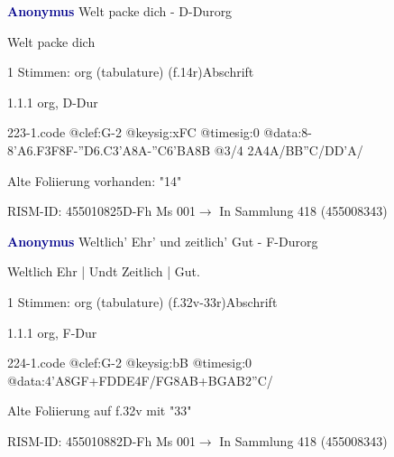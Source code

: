 \documentclass[twocolumn, 12pt]{book}
\begin{document}
\par \vspace{16pt} \textcolor{darkblue}{\textbf{Anonymus  }}\hfillplus{\textbf{[223]}}\newline Welt packe dich - D-Dur\newline org
\par \begin{itshape}[f.14r, at left:] Welt packe dich\end{itshape} 
\par \textcolor{darkblue}{}  1 Stimmen: org (tabulature)  (f.14r)\newline Abschrift
\par 1.1.1  org, D-Dur  
\begin{filecontents*}{223-1.code}
@clef:G-2
@keysig:xFC
@timesig:0
@data:8-{8'A6.F3F}8F-{''D6.C3'A}8A-''C{6'BA}8B @3/4 2A4A/BB''C/DD'A/
\end{filecontents*}
\newline %
\par Alte Foliierung vorhanden: "14"
\par RISM-ID: 455010825\newline D-Fh  Ms 001\newline $\rightarrow$ In Sammlung 418 (455008343)
      
\par \vspace{16pt} \textcolor{darkblue}{\textbf{Anonymus  }}\hfillplus{\textbf{[224]}}\newline Weltlich' Ehr' und zeitlich' Gut - F-Dur\newline org
\par \begin{itshape}[f.32v, at left:] Weltlich Ehr | Undt Zeitlich | Gut.\end{itshape} 
\par \textcolor{darkblue}{}  1 Stimmen: org (tabulature)  (f.32v-33r)\newline Abschrift
\par 1.1.1  org, F-Dur  
\begin{filecontents*}{224-1.code}
@clef:G-2
@keysig:bB
@timesig:0
@data:4'A{8GF+}{FDDE}4F/FG{8AB+}{BGAB}2''C/
\end{filecontents*}
\newline %
\par Alte Foliierung auf f.32v mit "33"
\par RISM-ID: 455010882\newline D-Fh  Ms 001\newline $\rightarrow$ In Sammlung 418 (455008343)
      
\end{document}
